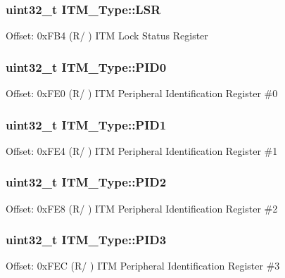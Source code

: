 \subsubsection[{\texorpdfstring{L\+SR}{LSR}}]{ uint32\+\_\+t I\+T\+M\+\_\+\+Type\+::\+L\+SR}\hypertarget{struct_i_t_m___type_aaa0515b1f6dd5e7d90b61ef67d8de77b}{}\label{struct_i_t_m___type_aaa0515b1f6dd5e7d90b61ef67d8de77b}
Offset\+: 0x\+F\+B4 (R/ ) I\+TM Lock Status Register 
\subsubsection[{\texorpdfstring{P\+I\+D0}{PID0}}]{ uint32\+\_\+t I\+T\+M\+\_\+\+Type\+::\+P\+I\+D0}\hypertarget{struct_i_t_m___type_ab69ade751350a7758affdfe396517535}{}\label{struct_i_t_m___type_ab69ade751350a7758affdfe396517535}
Offset\+: 0x\+F\+E0 (R/ ) I\+TM Peripheral Identification Register \#0 
\subsubsection[{\texorpdfstring{P\+I\+D1}{PID1}}]{ uint32\+\_\+t I\+T\+M\+\_\+\+Type\+::\+P\+I\+D1}\hypertarget{struct_i_t_m___type_a30e87ec6f93ecc9fe4f135ca8b068990}{}\label{struct_i_t_m___type_a30e87ec6f93ecc9fe4f135ca8b068990}
Offset\+: 0x\+F\+E4 (R/ ) I\+TM Peripheral Identification Register \#1 
\subsubsection[{\texorpdfstring{P\+I\+D2}{PID2}}]{ uint32\+\_\+t I\+T\+M\+\_\+\+Type\+::\+P\+I\+D2}\hypertarget{struct_i_t_m___type_ae139d2e588bb382573ffcce3625a88cd}{}\label{struct_i_t_m___type_ae139d2e588bb382573ffcce3625a88cd}
Offset\+: 0x\+F\+E8 (R/ ) I\+TM Peripheral Identification Register \#2 
\subsubsection[{\texorpdfstring{P\+I\+D3}{PID3}}]{ uint32\+\_\+t I\+T\+M\+\_\+\+Type\+::\+P\+I\+D3}\hypertarget{struct_i_t_m___type_af006ee26c7e61c9a3712a80ac74a6cf3}{}\label{struct_i_t_m___type_af006ee26c7e61c9a3712a80ac74a6cf3}
Offset\+: 0x\+F\+EC (R/ ) I\+TM Peripheral Identification Register \#3 
